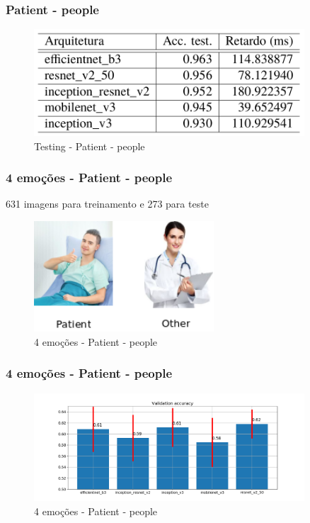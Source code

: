 
\begin{frame}
\frametitle{\textbf{Patient - people}}
\begin{figure}[!ht]
    \centering
    \caption{Testing - Patient - people}
    \includegraphics[width=0.9\textwidth]{images/cnn_patient_people/testing.png}
\end{figure}
\end{frame}


\begin{frame}
\frametitle{4 emoções - \textbf{Patient - people}}
631 imagens para treinamento e 273 para teste
\begin{figure}[!ht]
    \centering
    \caption{4 emoções - Patient - people}
    \includegraphics[width=0.6\textwidth]{images/cnn_patient_people/0-info.png}
\end{figure}
\end{frame}


\begin{frame}
\frametitle{4 emoções - \textbf{Patient - people}}
\begin{figure}[!ht]
    \centering
    \caption{4 emoções - Patient - people}
    \includegraphics[width=0.9\textwidth]{images/cnn_emotion4_patient_people/crossval.png}
\end{figure}
\end{frame}

